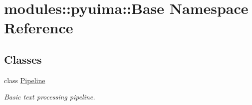 \hypertarget{namespacemodules_1_1pyuima_1_1Base}{\section{modules\-:\-:pyuima\-:\-:\-Base \-Namespace \-Reference}
\label{namespacemodules_1_1pyuima_1_1Base}
}
\subsection*{\-Classes}
\begin{DoxyCompactItemize}
\item 
class \hyperlink{classmodules_1_1pyuima_1_1Base_1_1Pipeline}{\-Pipeline}
\begin{DoxyCompactList}\small\item\em \-Basic text processing pipeline. \end{DoxyCompactList}\end{DoxyCompactItemize}
